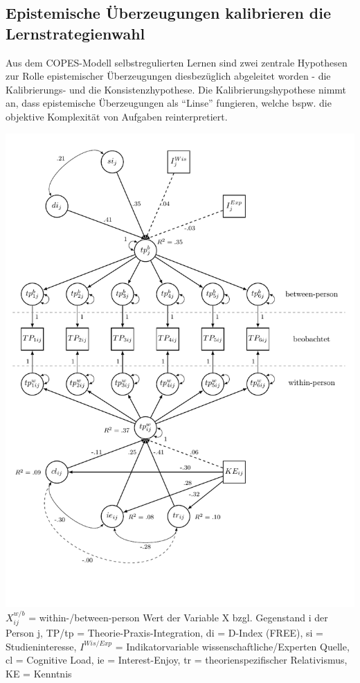 \documentclass[]{tufte-handout}
\begin{document}
\subsection{Epistemische Überzeugungen kalibrieren die
Lernstrategienwahl}\label{epistemische-uberzeugungen-kalibrieren-die-lernstrategienwahl}

Aus dem COPES-Modell selbstregulierten Lernen sind zwei zentrale
Hypothesen zur Rolle epistemischer Überzeugungen diesbezüglich
abgeleitet worden - die Kalibrierungs- und die Konsistenzhypothese. Die
Kalibrierungshypothese nimmt an, dass epistemische Überzeugungen als
``Linse'' fungieren, welche bspw. die objektive Komplexität von Aufgaben
reinterpretiert.

\begin{marginfigure}
\includegraphics{../Img/mind_the_gap_mlsem.pdf} \(X_{ij}^{w/b}\) =
within-/between-person Wert der Variable X bzgl. Gegenstand i der Person
j, TP/tp = Theorie-Praxis-Integration, di = D-Index (FREE), si =
Studieninteresse, \(I^{Wis/Exp}\) = Indikatorvariable
wissenschaftliche/Experten Quelle, cl = Cognitive Load, ie =
Interest-Enjoy, tr = theorienspezifischer Relativismus, KE = Kenntnis
\end{marginfigure}
\end{document}

